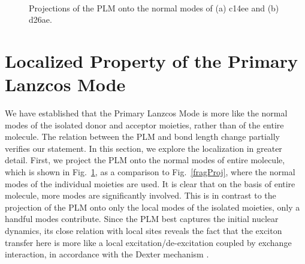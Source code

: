 \begin{figure}[!h]
\\
\caption{Projections of the PLM onto the normal modes of (a) c14ee and (b) d26ae.\label{LancProj}}
\end{figure}



\section{Localized Property of the Primary Lanzcos Mode}

We have established  that the Primary Lanzcos Mode is more like the normal modes of the isolated
donor and acceptor moieties, rather than of the entire molecule. The relation between the
PLM and bond length change partially verifies our statement.
In this section, we explore  the localization in greater detail.
First, we project the PLM onto the normal modes of entire molecule,
which is shown in Fig.~\ref{LancProj}, as a comparison to Fig.~\ref{fragProj}, where the normal modes of the individual moieties are used.    It is clear that on the basis of entire molecule, more modes are significantly involved.   This is in contrast to the projection of the PLM onto only the local modes of the isolated moieties, only a handful modes contribute.  Since the PLM  best captures the initial nuclear dynamics,
 its close relation with local sites reveals the fact that the exciton transfer here is more like a local excitation/de-excitation
coupled by exchange interaction,  in accordance with the Dexter mechanism \cite{dexter1953theory}.

